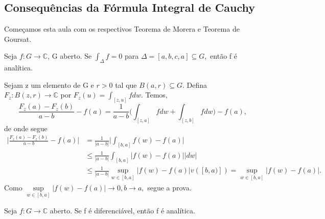 \documentclass[complex.tex]{subfiles}
\begin{document}
\subsection{Consequências da Fórmula Integral de Cauchy}
Começamos esta aula com os respectivos Teorema de Morera e Teorema de Goursat.
\hypertarget{morera}{\begin{theorem*}
		Seja $f:G\rightarrow \mathbb{C}$, G aberto. Se $\int_{\Delta}^{}f = 0$ para $\Delta = [a, b, c, a]\subseteq{G},$ então
		f é analítica.
	\end{theorem*}}\begin{proof*}
	Sejam z um elemento de G e $r > 0$ tal que $B(a, r)\subseteq{G}.$ Defina
	$F_{z}:B(z, r)\rightarrow \mathbb{C}$ por $F_{z}(u) = \int_{[z, u]}^{}f dw.$
	Temos,
	$$
		\frac{F_{z}(a) - F_{z}(b)}{a - b} - f(a) = \frac{1}{a-b}\biggl(\int_{[z, a]}^{}fdw + \int_{[z, b]}^{}fdw\biggr) - f(a),
	$$
	de onde segue
	\begin{align*}
		\biggl|\frac{F_{z}(a) - F_{z}(b)}{a-b} - f(a)\biggr| & = \frac{1}{|a-b|}\biggl|\int_{[b, a]}f(w) - f(a)\biggr|                                      \\
		                                                     & \leq \frac{1}{|a-b|}\int_{[b, a]}^{}|f(w) - f(a)||dw|                                        \\
		                                                     & \leq \frac{1}{|a-b|}\sup_{w\in[b, a]}|f(w) - f(a)|v([b, a)]) = \sup_{w\in[b, a]}|f(w)-f(a)|.
	\end{align*}
	Como $\sup\limits_{w\in[b, a]}|f(w) - f(a)|\to0, b\to{a},$ segue a prova. \qedsymbol
\end{proof*}
\hypertarget{goursat}{\begin{theorem*}
		Seja $f:G\rightarrow \mathbb{C}$ aberto. Se f é diferenciável, então f é analítica.
	\end{theorem*}}
\end{document}
